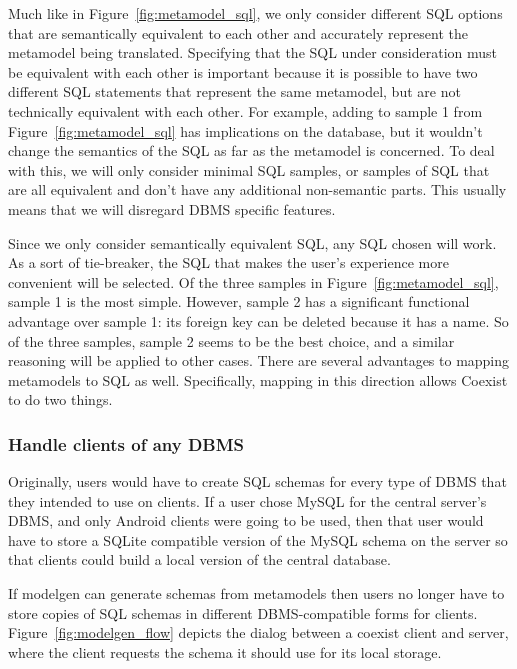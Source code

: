 Much like in Figure~\ref{fig:metamodel_sql}, we only consider different SQL
options that are semantically equivalent to each other and accurately represent
the metamodel being translated. Specifying that the SQL under consideration must
be equivalent with each other is important because it is possible to have two
different SQL statements that represent the same metamodel, but are not
technically equivalent with each other. For example, adding 
to sample 1 from Figure~\ref{fig:metamodel_sql} has implications on the
database, but it wouldn't change the semantics of the SQL as far as the
metamodel is concerned. To deal with this, we will only consider minimal SQL
samples, or samples of SQL that are all equivalent and don't have any additional
non-semantic parts. This usually means that we will disregard DBMS specific
features.

Since we only consider semantically equivalent SQL, any SQL chosen will work.
As a sort of tie-breaker, the SQL that makes the user's experience more
convenient will be selected. Of the three samples in Figure~\ref{fig:metamodel_sql},
sample 1 is the most simple. However, sample 2 has a significant functional advantage
over sample 1: its foreign key can be deleted because it has a name. So of the
three samples, sample 2 seems to be the best choice, and a similar reasoning
will be applied to other cases. There are several advantages to mapping
metamodels to SQL as well. Specifically, mapping in this direction allows
Coexist to do two things.


\setcounter{subsubsection}{0}
\subsubsection{Handle clients of any DBMS} \label{sec:mm_advantage}

Originally, users would have to create SQL schemas for every type of DBMS that
they intended to use on clients. If a user chose MySQL for the central server's
DBMS, and only Android clients were going to be used, then that user would have
to store a SQLite compatible version of the MySQL schema on the server so that
clients could build a local version of the central database.

If modelgen can generate schemas from metamodels then users no longer have to
store copies of SQL schemas in different DBMS-compatible forms for
clients. Figure~\ref{fig:modelgen_flow} depicts the dialog between a coexist
client and server, where the client requests the schema it should use for its
local storage.


